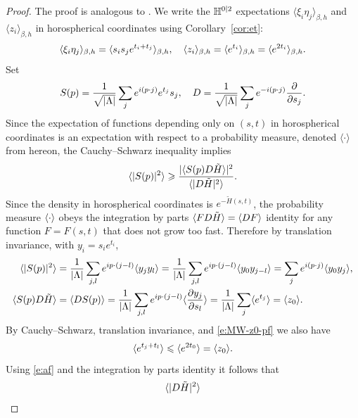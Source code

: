 \documentclass[11pt]{amsart}
\numberwithin{equation}{section}
\numberwithin{theorem}{section}
\newcommand{\ab}[1]{\langle #1 \rangle} %
\newcommand{\Hhoro}{\tilde H}
\begin{document}
\begin{proof}
  The proof is analogous to \cite[Theorem~1.5]{MR4021254}.
  We write the $\mathbb{H}^{0|2}$ expectations $\ab{\xi_i\eta_j}_{\beta,h}$ and $\ab{z_i}_{\beta,h}$
  in horospherical coordinates using Corollary~\ref{cor:et}:
  \begin{equation} \label{e:MW-z0-pf}
    \langle \xi_i\eta_j \rangle_{\beta,h}= \langle s_is_je^{t_i+t_j} \rangle_{\beta,h},
    \quad
    \langle z_i \rangle_{\beta,h} = \langle e^{t_i} \rangle_{\beta,h} = \langle e^{2t_i} \rangle_{\beta,h}.
  \end{equation}
  Set
  \begin{equation}
    S(p) = \frac{1}{\sqrt{|\Lambda|}} \sum_j e^{i(p\cdot j)} e^{t_j}s_j,
    \quad
    D = \frac{1}{\sqrt{|\Lambda|}} \sum_j e^{-i(p\cdot j)} \frac{\partial }{\partial s_j}.
  \end{equation}
  Since the expectation of functions depending only on $(s,t)$ in
  horospherical coordinates is an expectation with respect to a
  probability measure, denoted $\ab{\cdot}$ from hereon, the
  Cauchy--Schwarz inequality implies
  \begin{equation} \label{e:CS}
    \avg{|S(p)|^2} \geq \frac{|\avg{S(p)D\Hhoro}|^2}{\avg{|D\Hhoro|^2}}.
  \end{equation}
  Since the density in horospherical coordinates is $e^{-\Hhoro(s,t)}$,
  the probability measure $\langle \cdot \rangle$ obeys the integration by parts
  $\langle FD\tilde H \rangle = \langle DF \rangle$ identity for any function $F=F(s,t)$
  that does not grow too fast. Therefore by translation invariance,
  with $y_i = s_ie^{t_i}$,
  \begin{align}
    \label{e:S2-susy}
    \avg{|S(p)|^2}
    &= \frac{1}{|\Lambda|} \sum_{j,l} e^{i p\cdot(j-l)} \avg{y_jy_l}
      = \frac{1}{|\Lambda|} \sum_{j,l} e^{i p\cdot(j-l)} \avg{y_0y_{j-l}}
      = \sum_{j} e^{i (p\cdot j)} \avg{y_0y_{j}},
    \\
    \label{e:SH-susy}
    \avg{S(p)D\Hhoro}
    &= \avg{DS(p)}
      = \frac{1}{|\Lambda|} \sum_{j,l} e^{ip\cdot(j-l)}\avg{\ddp{y_j}{s_l}}
      = \frac{1}{|\Lambda|} \sum_{j} \avg{e^{t_j}}
      = \avg{z_0}.
  \end{align}
  By Cauchy--Schwarz, translation invariance, and \eqref{e:MW-z0-pf} we also have 
  \begin{equation}
    \label{e:af}
    \langle e^{t_j+t_l} \rangle
    \leqslant \langle e^{2t_0} \rangle = \langle z_0 \rangle.
  \end{equation}
  Using \eqref{e:af} and the integration by parts identity it
  follows that 
  \begin{equation}
    \avg{|D\Hhoro|^2}

\end{equation}
\end{proof}
\end{document}

